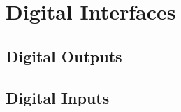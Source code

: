 \section{Digital Interfaces}\label{sec:digital-interfaces}

	\subsection{Digital Outputs}\label{ssec:digital-outputs}

	\subsection{Digital Inputs}\label{ssec:digital-inputs}